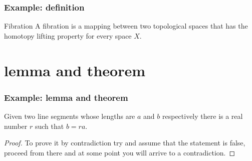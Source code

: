 \documentclass[12pt,aspectratio=169]{beamer}
\begin{document}
\begin{frame}[fragile]
  \frametitle{Example: definition}

  \theoremstyle{definition}
  \begin{definition}{Fibration}
    A fibration is a mapping between two topological spaces that has the homotopy
    lifting property for every space $X$.
  \end{definition}

\end{frame}

\section{lemma and theorem}

\begin{frame}
  \frametitle{Example: lemma and theorem}

  \begin{lemma}
    Given two line segments whose lengths are $a$ and $b$ respectively there
    is a real number $r$ such that $b=ra$.
  \end{lemma}

  \begin{proof}
    To prove it by contradiction try and assume that the statement is false,
    proceed from there and at some point you will arrive to a contradiction.
  \end{proof}
\end{frame}
\end{document}
